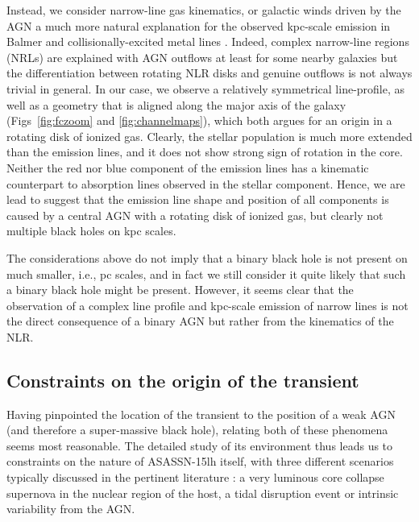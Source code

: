 \documentclass[traditabstract]{aa}
\begin{document}
Instead, we consider narrow-line gas kinematics, or galactic winds driven by the AGN a much more natural explanation for the observed kpc-scale emission in Balmer and collisionally-excited metal lines \citep[e.g.,][]{2011ApJ...735...48S}. Indeed, complex narrow-line regions (NRLs) are explained with AGN outflows at least for some nearby galaxies \citep[e.g.,][]{2011ApJ...727...71F} but the differentiation between rotating NLR disks and genuine outflows is not always trivial \citep{2011ApJ...735...48S, 2015ApJ...813..103M} in general. In our case, we observe a relatively symmetrical line-profile, as well as a geometry that is aligned along the major axis of the galaxy (Figs~\ref{fig:fczoom} and \ref{fig:channelmaps}), which both argues for an origin in a rotating disk of ionized gas. Clearly, the stellar population is much more extended than the emission lines, and it does not show strong sign of rotation in the core. Neither the red nor blue component of the emission lines has a kinematic counterpart to absorption lines observed in the stellar component. Hence, we are lead to suggest that the emission line shape and position of all components is caused by a central AGN with a rotating disk of ionized gas, but clearly not multiple black holes on kpc scales.

The considerations above do not imply that a binary black hole is not present on much smaller, i.e., pc scales, and in fact we still consider it quite likely that such a binary black hole might be present. However, it seems clear that the observation of a complex line profile and kpc-scale emission of narrow lines is not the direct consequence of a binary AGN but rather from the kinematics of the NLR.

\subsection{Constraints on the origin of the transient}

Having pinpointed the location of the transient to the position of a weak AGN (and therefore a super-massive black hole), relating both of these phenomena seems most reasonable. The detailed study of its environment thus leads us to constraints on the nature of ASASSN-15lh itself, with three different scenarios typically discussed in the pertinent literature \citep[e.g.,][]{2011ApJ...735..106D, 2014MNRAS.445.3263H, 2015ApJ...798...12V}: a very luminous core collapse supernova in the nuclear region of the host, a tidal disruption event or intrinsic variability from the AGN.
\end{document}
